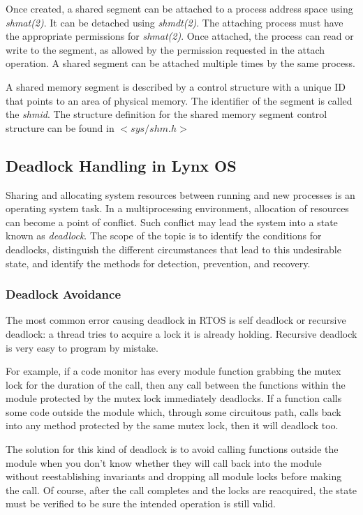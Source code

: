 \documentclass[12pt]{article}
\begin{document}
Once created, a shared segment can be attached to a process address space using \emph{shmat(2)}. It can be detached using \emph{shmdt(2)}. The attaching process must have the appropriate permissions for \emph{shmat(2)}. Once attached, the process can read or write to the segment, as allowed by the permission requested in the attach operation. A shared segment can be attached multiple times by the same process.

A shared memory segment is described by a control structure with a unique ID that points to an area of physical memory. The identifier of the segment is called the \emph{shmid}. The structure definition for the shared memory segment control structure can be found in $<sys/shm.h>$

\subsection{Deadlock Handling in Lynx OS}
Sharing and allocating system resources between running and new processes is an operating system task. In a multiprocessing environment, allocation of resources can become a point of conflict. Such conflict may lead the system into a state known as \emph{deadlock}. The scope of the topic is to identify the conditions for deadlocks, distinguish the different circumstances that lead to this undesirable state, and identify the methods for detection, prevention, and recovery.

\subsubsection{Deadlock Avoidance}

The most common error causing deadlock in RTOS is self deadlock or recursive deadlock: a thread tries to acquire a lock it is already holding. Recursive deadlock is very easy to program by mistake.

For example, if a code monitor has every module function grabbing the mutex lock for the duration of the call, then any call between the functions within the module protected by the mutex lock immediately deadlocks. If a function calls some code outside the module which, through some circuitous path, calls back into any method protected by the same mutex lock, then it will deadlock too.

The solution for this kind of deadlock is to avoid calling functions outside the module when you don't know whether they will call back into the module without reestablishing invariants and dropping all module locks before making the call. Of course, after the call completes and the locks are reacquired, the state must be verified to be sure the intended operation is still valid.
\end{document}
